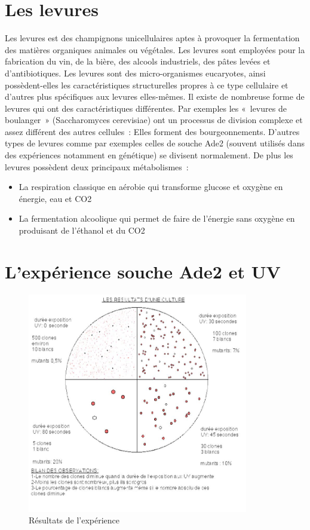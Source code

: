 \label{DefLevures}
\section{Les levures}
Les levures est des champignons unicellulaires aptes à provoquer la fermentation des matières organiques animales ou végétales. Les levures sont employées pour la fabrication du vin, de la bière, des alcools industriels, des pâtes levées et d'antibiotiques. Les levures sont des micro-organismes eucaryotes, ainsi possèdent-elles les caractéristiques structurelles propres à ce type cellulaire et d'autres plus spécifiques aux levures elles-mêmes. Il existe de nombreuse forme de levures qui ont des caractéristiques différentes. Par exemples les « levures de boulanger » (Saccharomyces cerevisiae) ont un processus de division complexe et assez différent des autres cellules : Elles forment des bourgeonnements. D’autres types de levures comme par exemples celles de souche Ade2 (souvent utilisés dans des expériences notamment  en génétique) se divisent normalement. De plus les levures possèdent deux principaux métabolismes :

\begin{itemize}
	\item La respiration classique en aérobie qui transforme glucose et oxygène en énergie, eau et CO2 
	\item La fermentation alcoolique qui permet de faire de l’énergie sans oxygène en produisant de l’éthanol  et du CO2
\end{itemize}

\section{L’expérience souche Ade2 et UV}
\begin{figure}[H]
	\centering
	\includegraphics[width=26em]{Annexes/Images/lev.jpg}
	\caption{Résultats de l'expérience}
\end{figure}

